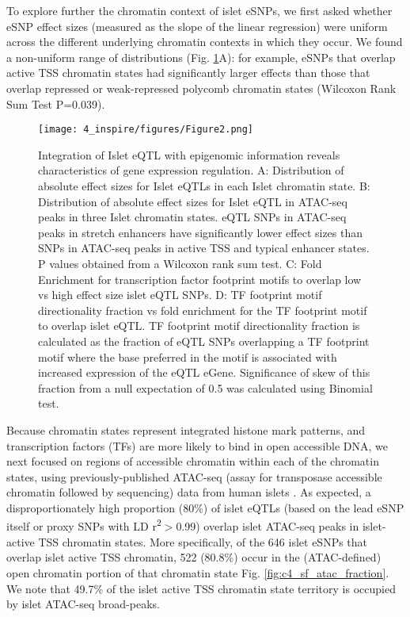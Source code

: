 To explore further the chromatin context of islet eSNPs, we first asked whether eSNP effect sizes (measured as the slope of the linear regression) were uniform across the different underlying chromatin contexts in which they occur. We found a non-uniform range of distributions (Fig. \ref{fig:c4_f2}A): for example, eSNPs that overlap active TSS chromatin states had significantly larger effects than those that overlap repressed or weak-repressed polycomb chromatin states (Wilcoxon Rank Sum Test P=0.039). 

\begin{figure}
    \centering
    \texttt{[image: 4\_inspire/figures/Figure2.png]}
    \caption[Integration of Islet eQTL with epigenomic information reveals characteristics of gene expression regulation]{Integration of Islet eQTL with epigenomic information reveals characteristics of gene expression regulation. A: Distribution of absolute effect sizes for Islet eQTLs in each Islet chromatin state. B: Distribution of absolute effect sizes for Islet eQTL in ATAC-seq peaks in three Islet chromatin states. eQTL SNPs in ATAC-seq peaks in stretch enhancers have significantly lower effect sizes than SNPs in ATAC-seq peaks in active TSS and typical enhancer states. P values obtained from a Wilcoxon rank sum test. C: Fold Enrichment for transcription factor footprint motifs to overlap low vs high effect size islet eQTL SNPs. D: TF footprint motif directionality fraction vs fold enrichment for the TF footprint motif to overlap islet eQTL. TF footprint motif directionality fraction is calculated as the fraction of eQTL SNPs overlapping a TF footprint motif where the base preferred in the motif is associated with increased expression of the eQTL eGene. Significance of skew of this fraction from a null expectation of 0.5 was calculated using Binomial test. }
    \label{fig:c4_f2}
\end{figure}
  
Because chromatin states represent integrated histone mark patterns, and transcription factors (TFs) are more likely to bind in open accessible DNA, we next focused on regions of accessible chromatin within each of the chromatin states, using previously-published ATAC-seq (assay for transposase accessible chromatin followed by sequencing) data from human islets \cite{varshneyGeneticRegulatorySignatures2017}. As expected, a disproportionately high proportion (80\%) of islet eQTLs (based on the lead eSNP itself or proxy SNPs with LD r\textsuperscript{2}$>$0.99) overlap islet ATAC-seq peaks in islet-active TSS chromatin states. More specifically, of the 646 islet eSNPs that overlap islet active TSS chromatin, 522 (80.8\%) occur in the (ATAC-defined) open chromatin portion of that chromatin state Fig. \ref{fig:c4_sf_atac_fraction}. We note that 49.7\% of the islet active TSS chromatin state territory is occupied by islet ATAC-seq broad-peaks.

